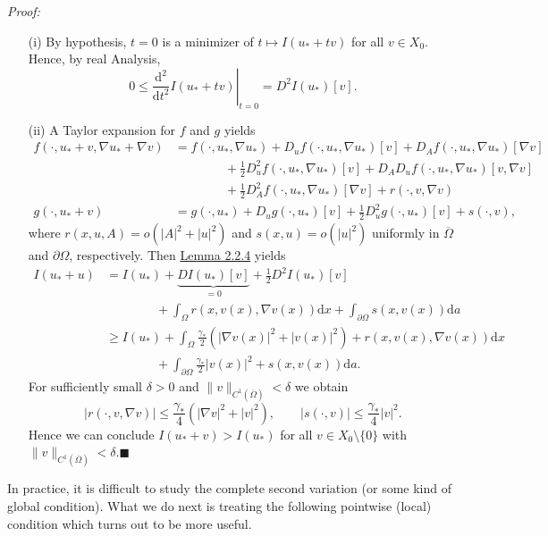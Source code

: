\textit{Proof:}
\begin{itemize}
	\item[(i)] By hypothesis, $t=0$ is a minimizer of $t\longmapsto I(u_*+tv)$ for all $v\in X_0$. Hence, by real Analysis,
	\[0\leq\left.\frac{\mathrm{d}^2}{\mathrm{d}t^2}I(u_*+tv)\right|_{t=0}=D^2I(u_*)[v].\]
	\item[(ii)] A Taylor expansion for $f$ and $g$ yields
	\begin{align*}
		f(\cdot,u_*+v,\nabla u_*+\nabla v)&=f(\cdot,u_*,\nabla u_*)+D_uf(\cdot,u_*,\nabla u_*)[v]+D_Af(\cdot,u_*,\nabla u_*)[\nabla v]\\
		&\qquad\qquad+\frac{1}{2}D_u^2f(\cdot,u_*,\nabla u_*)[v]+D_AD_uf(\cdot,u_*,\nabla u_*)[v,\nabla v]\\
		&\qquad\qquad+\frac{1}{2}D_A^2f(\cdot,u_*,\nabla u_*)[\nabla v]+r(\cdot,v,\nabla v)\\
		g(\cdot,u_*+v)&=g(\cdot,u_*)+D_ug(\cdot,u_*)[v]+\frac{1}{2}D_u^2g(\cdot,u_*)[v]+s(\cdot,v),
	\end{align*}
	where $r(x,u,A)=o(\lvert A\rvert^2+\lvert u\rvert^2)$ and $s(x,u)=o(\lvert u\rvert^2)$ uniformly in $\overline{\Omega}$ and $\partial\Omega$, respectively. Then \hyperlink{lemma_2_2_4}{Lemma 2.2.4} yields
	\begin{align*}
		I(u_*+u)&=I(u_*)+\underbrace{DI(u_*)[v]}_{=0}+\frac{1}{2}D^2I(u_*)[v]\\
		&\qquad\qquad+\int_\Omega{r(x,v(x),\nabla v(x))\mathrm{d}x}+\int_{\partial\Omega}{s(x,v(x))\mathrm{d}a}\\
		&\geq I(u_*)+\int_\Omega{\frac{\gamma_*}{2}\left(\lvert\nabla v(x)\rvert^2+\lvert v(x)\rvert^2\right)+r(x,v(x),\nabla v(x))\mathrm{d}x}\\
		&\qquad\qquad+\int_{\partial\Omega}{\frac{\gamma_*}{2}\lvert v(x)\rvert^2+s(x,v(x))\mathrm{d}a}.
	\end{align*}
	For sufficiently small $\delta>0$ and $\lVert v\rVert_{C^1(\overline{\Omega})}<\delta$ we obtain
	\[\lvert r(\cdot,v,\nabla v)\rvert\leq\frac{\gamma_*}{4}\left(\lvert\nabla v\rvert^2+\lvert v\rvert^2\right),\qquad\lvert s(\cdot,v)\rvert\leq\frac{\gamma_*}{4}\lvert v\rvert^2.\]
	Hence we can conclude $I(u_*+v)>I(u_*)$ for all $v\in X_0\setminus\{0\}$ with $\lVert v\rVert_{C^1(\overline{\Omega})}<\delta$.\hfill$\blacksquare$\\[11pt]
\end{itemize}

In practice, it is difficult to study the complete second variation (or some kind of global condition). What we do next is treating the following pointwise (local) condition which turns out to be more useful.\\

